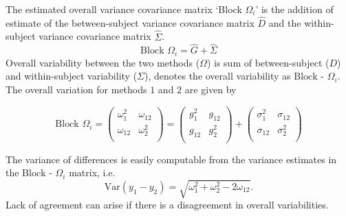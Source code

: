 \documentclass[12pt, a4paper]{report}
\theoremstyle{plain}
\theoremstyle{definition}
\theoremstyle{remark}
\begin{document}
The estimated overall variance covariance matrix `Block $\Omega_{i}$' is the addition of estimate of the between-subject variance covariance matrix $\hat{D}$ and the within-subject variance covariance matrix $\hat{\Sigma}$.
	\begin{equation}
	\mbox{Block  }\Omega_{i} = \hat{G} + \hat{\Sigma}
	\end{equation}
Overall variability between the two methods ($\Omega$) is sum of between-subject ($D$) and within-subject variability ($\Sigma$), \citet{ARoy2009} denotes the overall variability	as ${\mbox{Block - } \Omega_{i}}$. The overall variation for methods $1$ and $2$ are given by
	\begin{center}
		\[\mbox{Block } {\Omega}_i = \left(\begin{array}{cc}
		\omega^2_1  & \omega_{12} \\
		\omega_{12} & \omega^2_2 \\
		\end{array}  \right)
		=  \left(
		\begin{array}{cc}
		g^2_1  & g_{12} \\
		g_{12} & g^2_2 \\
		\end{array} \right)+
		\left(
		\begin{array}{cc}
		\sigma^2_1  & \sigma_{12} \\
		\sigma_{12} & \sigma^2_2 \\
		\end{array}\right)
		\]
	\end{center}
	
%	

The variance of differences is easily computable from the variance estimates in the ${\mbox{Block - } \Omega_{i}}$ matrix, i.e.
\[
\mathrm{Var}(y_1 - y_2) = \sqrt{ \omega^2_1 + \omega^2_2 - 2\omega_{12}}.
\]	
Lack of agreement can arise if there is a disagreement in overall variabilities. 
\end{document}
